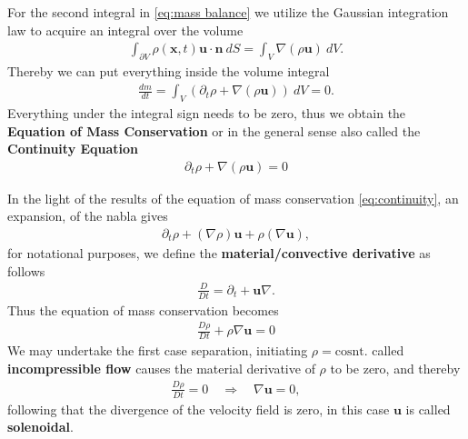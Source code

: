 For the second integral in \ref{eq:mass balance} we utilize the Gaussian
integration law to acquire an integral over the volume
\begin{align}
    \int_{\partial V} \rho(\mathbf{x}, t) \mathbf{u} \cdot \mathbf{n} \ dS =
    \int_V \nabla (\rho \mathbf{u})\ dV.
\end{align}
Thereby we can put everything inside the volume integral
\begin{align}
    \frac{d m}{dt} = \int_V \left(\partial_t \rho + \nabla(\rho \mathbf{u}) \right) \ dV = 0.
\end{align}
Everything under the integral sign needs to be zero, thus we obtain
the \textbf{Equation of Mass Conservation} or in the general sense also
called the \textbf{Continuity Equation}
\begin{align}\label{eq:continuity}
    \partial_t \rho + \nabla(\rho \mathbf{u}) = 0
\end{align}

In the light of the results of the equation of mass conservation
\ref{eq:continuity}, an expansion, of the nabla gives
\begin{align}
    \partial_t \rho + (\nabla \rho)\mathbf{u} + \rho(\nabla \mathbf{u}),
\end{align}
for notational purposes, we define the \textbf{material/convective derivative}
as follows
\begin{align}
    \frac{D}{Dt} = \partial_t + \mathbf{u}\nabla.
\end{align}
Thus the equation of mass conservation becomes
\begin{align}
    \frac{D\rho}{Dt} + \rho \nabla\mathbf{u} = 0
\end{align}
We may undertake the first case separation, initiating $\rho = \text{cosnt.}$
called \textbf{incompressible flow} causes the material derivative of $\rho$ to
be zero, and thereby
\begin{align}
    \frac{D\rho}{Dt} = 0 \quad \Rightarrow \quad \nabla \mathbf{u} = 0,
\end{align}
following that the divergence of the velocity field is zero, in this case
$\mathbf{u}$ is called \textbf{solenoidal}.
